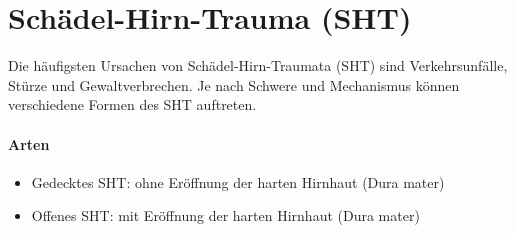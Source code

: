 










\section{Sch\"adel-Hirn-Trauma (SHT)}
 Die häufigsten Ursachen von Schädel-Hirn-Traumata (SHT) sind Verkehrsunfälle, Stürze und Gewaltverbrechen. Je nach Schwere und Mechanismus können verschiedene Formen des SHT auftreten.


\paragraph{Arten}

\begin{itemize}
\item Gedecktes SHT: ohne  Er\"offnung der harten Hirnhaut (Dura  mater)
\item Offenes SHT: mit  Er\"offnung der harten Hirnhaut (Dura  mater)
\end{itemize}

